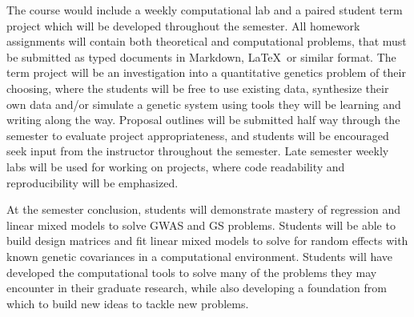 \documentclass[10pt]{article}
\begin{document}
The course would include a weekly computational lab and a paired student term project which will be developed throughout the semester. All homework assignments will contain both theoretical and computational problems, that must be submitted as typed documents in Markdown, \LaTeX\ or similar format. The term project will be an investigation into a quantitative genetics problem of their choosing, where the students will be free to use existing data, synthesize their own data and/or simulate a genetic system using tools they will be learning and writing along the way. Proposal outlines will be submitted half way through the semester to evaluate project appropriateness, and students will be encouraged seek input from the instructor throughout the semester. Late semester weekly labs will be used for working on projects, where code readability and reproducibility will be emphasized.

At the semester conclusion, students will demonstrate mastery of regression and linear mixed models to solve GWAS and GS problems. Students will be able to build design matrices and fit linear mixed models to solve for random effects with known genetic covariances in a computational environment. Students will have developed the computational tools to solve many of the problems they may encounter in their graduate research, while also developing a foundation from which to build new ideas to tackle new problems. 





\end{document}
